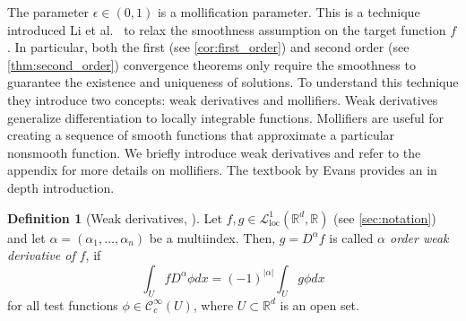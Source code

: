 \documentclass[12pt]{article}
\theoremstyle{definition}
\newtheorem{definition}[definition]{Definition}
\numberwithin{equation}{section}
\newcommand{\R}{\mathbb{R}}
\newcommand{\CL}{\mathcal{L}}
\newcommand{\CC}{\mathcal{C}}
\begin{document}
The parameter $\epsilon \in (0,1)$ is a mollification parameter. This is a technique introduced Li et al.\ \cite{liStochasticModifiedEquations2019} to relax the smoothness assumption on the target function $f$. In particular, both the first (see \autoref{cor:first_order}) and second order (see \autoref{thm:second_order})  convergence theorems only require the smoothness to guarantee the existence and uniqueness of solutions.
To understand this technique they introduce two concepts: weak derivatives and mollifiers. Weak derivatives generalize differentiation to locally integrable functions. Mollifiers are useful for creating a sequence of smooth functions that approximate a particular nonsmooth function. We briefly introduce weak derivatives and refer to the appendix for more details on mollifiers. The textbook by Evans \cite[pp.~629]{evansPartialDifferentialEquations2010} provides an in depth introduction.
\begin{definition}[Weak derivatives, ]
  \label{def:weak_derivatives}
  Let $f,g \in \CL^1_{\text{loc}}(\R^d, \R)$ (see \autoref{sec:notation}) and let $\alpha = (\alpha_1, \dots, \alpha_n)$ be a multiindex. Then, $g = D^{\alpha} f$ is called \emph{$\alpha$ order weak derivative of $f$}, if
  \begin{equation}
    \label{eq:weak_derivative}
    \int_U f D^{\alpha} \phi dx = (-1)^{|\alpha|} \int_U g \phi dx
  \end{equation}
  for all test functions $\phi \in \CC_c^{\infty}(U)$, where $U \subset \R^d$ is an open set.
\end{definition}
\end{document}
